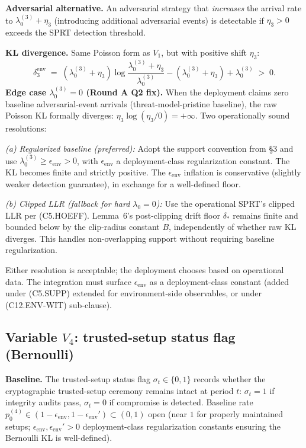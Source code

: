 \documentclass{article}
\newcommand{\deltastar}{\delta_{*}}
\newcommand{\eenv}{\epsilon_{\mathrm{env}}}
\newcommand{\Bclip}{B}
\begin{document}
\textbf{Adversarial alternative.}  An adversarial strategy that
\emph{increases} the arrival rate to $\lambda_0^{(3)} + \eta_3$
(introducing additional adversarial events) is detectable if
$\eta_3 > 0$ exceeds the SPRT detection threshold.

\textbf{KL divergence.}  Same Poisson form as $V_1$, but with
positive shift $\eta_3$:
\[
  \delta_3^{\mathrm{env}} \;=\; (\lambda_0^{(3)} + \eta_3)
  \log\!\frac{\lambda_0^{(3)} + \eta_3}{\lambda_0^{(3)}} -
  (\lambda_0^{(3)} + \eta_3) + \lambda_0^{(3)} \;>\; 0.
\]
\textbf{Edge case $\lambda_0^{(3)} = 0$ (Round A Q2 fix).}  When
the deployment claims zero baseline adversarial-event arrivals
(threat-model-pristine baseline), the raw Poisson KL formally
diverges: $\eta_3 \log(\eta_3/0) = +\infty$.  Two operationally
sound resolutions:

\emph{(a) Regularized baseline (preferred):}  Adopt the support
convention from §3 and use $\lambda_0^{(3)} \geq \eenv > 0$, with
$\eenv$ a deployment-class regularization constant.  The KL becomes
finite and strictly positive.  The $\eenv$ inflation is conservative
(slightly weaker detection guarantee), in exchange for a
well-defined floor.

\emph{(b) Clipped LLR (fallback for hard $\lambda_0 = 0$):}  Use
the operational SPRT's clipped LLR per (C5.HOEFF).  Lemma~6's
post-clipping drift floor $\deltastar$ remains finite and bounded
below by the clip-radius constant $\Bclip$, independently of
whether raw KL diverges.  This handles non-overlapping support
without requiring baseline regularization.

Either resolution is acceptable; the deployment chooses based on
operational data.  The integration must surface $\eenv$ as a
deployment-class constant (added under (C5.SUPP) extended for
environment-side observables, or under (C12.ENV-WIT) sub-clause).

\subsection{Variable $V_4$: trusted-setup status flag (Bernoulli)}

\textbf{Baseline.}  The trusted-setup status flag $\sigma_t \in
\{0, 1\}$ records whether the cryptographic trusted-setup ceremony
remains intact at period $t$: $\sigma_t = 1$ if integrity audits
pass, $\sigma_t = 0$ if compromise is detected.  Baseline rate
$p_0^{(4)} \in (1 - \eenv, 1 - \eenv') \subset (0, 1)$ open
(near $1$ for properly maintained setups; $\eenv, \eenv' > 0$
deployment-class regularization constants ensuring the Bernoulli
KL is well-defined).
\end{document}
